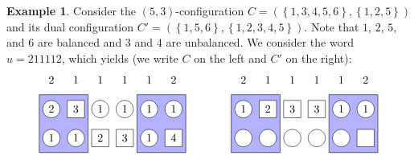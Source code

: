 \documentclass[reqno]{amsart}
\newcommand{\0}{\phantom{c}}
\newcommand{\set}[1]{\left\{ #1 \right\}}
\theoremstyle{plain}
\theoremstyle{definition}
\newtheorem{example}[thm]{Example}
\numberwithin{equation}{section}
\begin{document}
\begin{example}
\label{ex:proof_process}
Consider the $(5,3)$-configuration $C = (\set{1,3,4,5,6}, \set{1,2,5})$ and its dual configuration $C' = (\set{1,5,6}, \set{1,2,3,4,5})$.
Note that $1$, $2$, $5$, and $6$ are balanced and $3$ and $4$ are unbalanced.
We consider the word $u = 211112$, which yields (we write $C$ on the left and $C'$ on the right):
\[
\begin{tikzpicture}[scale=0.9]
  \def\sc{0.85}   %
  \def\lll{3}  %
  \def\ll{2}   %
  \def\l{1}   %
  \draw[fill=blue!30] (0.5*\sc,\l-.5) rectangle(2.5*\sc,\ll+.5);
  \draw[fill=blue!30] (4.5*\sc,\l-.5) rectangle(6.5*\sc,\ll+.5);
  \foreach \i in {1,3,4,5,6} { \draw[fill=white] (\i*\sc,\ll) circle (0.3); }
  \foreach \i in {2} { \draw[fill=white] (\i*\sc-.3,\ll-.3) rectangle +(0.6,+0.6); }
  \foreach \i in {1,2,5} { \draw[fill=white] (\i*\sc,\l) circle (0.3); }
  \foreach \i in {3,4,6} { \draw[fill=white] (\i*\sc-.3,\l-.3) rectangle +(0.6,+0.6); }
  \foreach \i in {2,3,4,5} { \node at (\i*\sc,\lll) {$1$}; }
  \foreach \i in {1,6} { \node at (\i*\sc,\lll) {$2$}; }
  \foreach \i in {3,4,5,6} { \node at (\i*\sc,\ll) {$1$}; }
  \foreach \i in {1} { \node at (\i*\sc,\ll) {$2$}; }
  \foreach \i in {2} { \node at (\i*\sc,\ll) {$3$}; }
  \foreach \i in {1,2,5} { \node at (\i*\sc,\l) {$1$}; }
  \foreach \i in {3} { \node at (\i*\sc,\l) {$2$}; }
  \foreach \i in {4} { \node at (\i*\sc,\l) {$3$}; }
  \foreach \i in {6} { \node at (\i*\sc,\l) {$4$}; }
\end{tikzpicture}
\hspace{40pt}
\begin{tikzpicture}[scale=0.9]
  \def\sc{0.85}   %
  \def\lll{3}  %
  \def\ll{2}   %
  \def\l{1}   %
  \draw[fill=blue!30] (0.5*\sc,\l-.5) rectangle(2.5*\sc,\ll+.5);
  \draw[fill=blue!30] (4.5*\sc,\l-.5) rectangle(6.5*\sc,\ll+.5);
  \foreach \i in {1,5,6} { \draw[fill=white] (\i*\sc,\ll) circle (0.3); }
  \foreach \i in {2,3,4} { \draw[fill=white] (\i*\sc-.3,\ll-.3) rectangle +(0.6,+0.6); }
  \foreach \i in {1,2,3,4,5} { \draw[fill=white] (\i*\sc,\l) circle (0.3); }
  \foreach \i in {6} { \draw[fill=white] (\i*\sc-.3,\l-.3) rectangle +(0.6,+0.6); }
  \foreach \i in {2,3,4,5} { \node at (\i*\sc,\lll) {$1$}; }
  \foreach \i in {1,6} { \node at (\i*\sc,\lll) {$2$}; }
  \foreach \i in {1,5,6} { \node at (\i*\sc,\ll) {$1$}; }
  \foreach \i in {2} { \node at (\i*\sc,\ll) {$2$}; }
  \foreach \i in {3,4} { \node at (\i*\sc,\ll) {$3$}; }

\end{tikzpicture}\]
\end{example}
\end{document}
